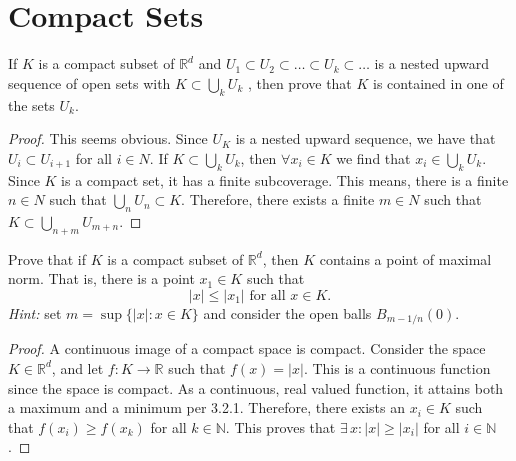 \documentclass[12pt]{book}
\newcommand{\N}{\mathbb{N}}
\newcommand{\R}{\mathbb{R}}
\newenvironment{exercise}[2][Exercise]{\begin{trivlist}
\item[\hskip \labelsep {\bfseries #1}\hskip \labelsep {\bfseries #2.}]}{\end{trivlist}}
\begin{document}
\section{Compact Sets}


\begin{exercise}{7.4.1}
If $K$ is a compact subset of $\R^d$ and $U_1 \subset U_2 \subset \hdots \subset U_k \subset \hdots$ is a
nested upward sequence of open sets with $K \subset \bigcup_k U_k$ , then prove that $K$ is contained in one of the sets $U_k$.



\begin{proof}
    This seems obvious. Since $U_K$ is a nested upward sequence, we have that $U_i \subset U_{i+1}$ for all $i\in N$. If $K \subset \bigcup_k U_k$, then $\forall x_i \in K$ we find that $x_i \in \bigcup_k U_k$. Since $K$ is a compact set, it has a finite subcoverage. This means, there is a finite $n \in N$ such that $\bigcup_n U_n \subset K$. Therefore, there exists a finite $m \in N$ such that $K \subset \bigcup_{n+m} U_{m+n}$.  
\end{proof}
\end{exercise}




\begin{exercise}{7.4.4}
Prove that if $K$ is a compact subset of $\R^d$, then $K$ contains a point of maximal norm. That is, there is a point $x_1 \in K$ such that 
    \[ |x| \leq |x_1| \text{ for all } x \in K. \]
\emph{Hint:} set $m =\sup\{ |x| : x \in K \}$  and consider the open balls $B_{m-1/n}(0)$.
    
    \begin{proof}
    A continuous image of a compact space is compact. Consider the space $K \in \R^d$, and let $f:K \to \R$ such that $f(x)=|x|$. This is a continuous function since the space is compact. As a continuous, real valued function, it attains both a maximum and a minimum per 3.2.1. Therefore, there exists an $x_i \in K$ such that $f(x_i) \geq f(x_k)$ for all $k \in \N$. This proves that $\exists \,x : |x| \geq |x_i|$ for all $i \in \N$.
    \end{proof}
\end{exercise}
\end{document}
